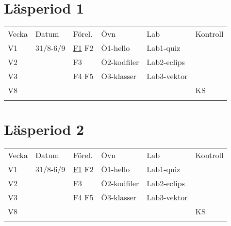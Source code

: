 \section{Läsperiod 1}\label{lasperiod-1}

\begin{longtable}[c]{@{}llllll@{}}
\toprule\addlinespace
Vecka & Datum & Förel. & Övn & Lab & Kontroll
\\\addlinespace
\midrule\endhead
V1 & 31/8-6/9 & \href{http://bjornregnell.se}{F1} F2 & Ö1-hello &
Lab1-quiz &
\\\addlinespace
V2 & & F3 & Ö2-kodfiler & Lab2-eclips &
\\\addlinespace
V3 & & F4 F5 & Ö3-klasser & Lab3-vektor &
\\\addlinespace
V8 & & & & & KS
\\\addlinespace
\bottomrule
\end{longtable}

\section{Läsperiod 2}\label{lasperiod-2}

\begin{longtable}[c]{@{}llllll@{}}
\toprule\addlinespace
Vecka & Datum & Förel. & Övn & Lab & Kontroll
\\\addlinespace
\midrule\endhead
V1 & 31/8-6/9 & \href{http://bjornregnell.se}{F1} F2 & Ö1-hello &
Lab1-quiz &
\\\addlinespace
V2 & & F3 & Ö2-kodfiler & Lab2-eclips &
\\\addlinespace
V3 & & F4 F5 & Ö3-klasser & Lab3-vektor &
\\\addlinespace
V8 & & & & & KS
\\\addlinespace
\bottomrule
\end{longtable}
